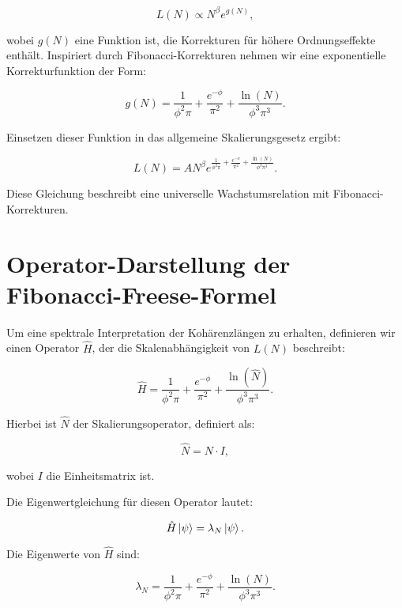 \documentclass[a4paper,12pt]{article}
\begin{document}
\begin{equation}
    L(N) \propto N^\beta e^{g(N)},
\end{equation}

wobei \( g(N) \) eine Funktion ist, die Korrekturen für höhere Ordnungseffekte enthält. Inspiriert durch Fibonacci-Korrekturen nehmen wir eine exponentielle Korrekturfunktion der Form:

\begin{equation}
    g(N) = \frac{1}{\phi^2 \pi} + \frac{e^{-\phi}}{\pi^2} + \frac{\ln(N)}{\phi^3 \pi^3}.
\end{equation}

Einsetzen dieser Funktion in das allgemeine Skalierungsgesetz ergibt:

\begin{equation}
    L(N) = A N^\beta e^{\frac{1}{\phi^2 \pi} + \frac{e^{-\phi}}{\pi^2} + \frac{\ln(N)}{\phi^3 \pi^3}}.
\end{equation}

Diese Gleichung beschreibt eine universelle Wachstumsrelation mit Fibonacci-Korrekturen.

\section{Operator-Darstellung der Fibonacci-Freese-Formel}
Um eine spektrale Interpretation der Kohärenzlängen zu erhalten, definieren wir einen Operator \( \hat{H} \), der die Skalenabhängigkeit von \( L(N) \) beschreibt:

\begin{equation}
    \hat{H} = \frac{1}{\phi^2 \pi} + \frac{e^{-\phi}}{\pi^2} + \frac{\ln(\hat{N})}{\phi^3 \pi^3}.
\end{equation}

Hierbei ist \( \hat{N} \) der Skalierungsoperator, definiert als:

\begin{equation}
    \hat{N} = N \cdot I,
\end{equation}

wobei \( I \) die Einheitsmatrix ist.

Die Eigenwertgleichung für diesen Operator lautet:

\begin{equation}
    \hat{H} \ket{\psi} = \lambda_N \ket{\psi}.
\end{equation}

Die Eigenwerte von \( \hat{H} \) sind:

\begin{equation}
    \lambda_N = \frac{1}{\phi^2 \pi} + \frac{e^{-\phi}}{\pi^2} + \frac{\ln(N)}{\phi^3 \pi^3}.
\end{equation}
\end{document}
